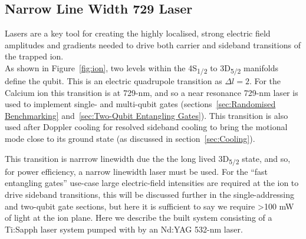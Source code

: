     
\subsection{Narrow Line Width 729 Laser}
\label{sec:Narrow Line Width 729 Laser} 

    Lasers are a key tool for creating the highly localised, strong electric
    field amplitudes and gradients needed to drive both carrier and sideband
    transitions of the trapped ion.\\ As shown in Figure~\ref{fig:ion}, 
    two levels within the 4S\textsubscript{1/2} to 3D\textsubscript{5/2}
    manifolds define the qubit. This is an electric quadrupole transition as
    $\Delta l = 2$.  For the Calcium ion this transition is at 729-nm, and so 
    a near resonance 729-nm laser is used to implement single- and multi-qubit gates
    (sections~\ref{sec:Randomised Benchmarking} and~\ref{sec:Two-Qubit
    Entangling Gates}). This transition is also used after Doppler cooling for
    resolved sideband cooling to bring the motional mode close to its ground
    state (as discussed in section~\ref{sec:Cooling}).

    This transition is narrrow linewidth due the the long lived
    3D\textsubscript{5/2} state, and so, for power efficiency, a
    narrow linewidth laser must be used. For the ``fast entangling gates'' use-case 
    large electric-field intensities are required at the ion to drive sideband
    transitions, this will be discussed further in the single-addressing and
    two-qubit gate sections, but here it is sufficient to say we require >100 mW
    of light at the ion plane.  Here we describe the built system 
    consisting of a Ti:Sapph laser system pumped with by an Nd:YAG 532-nm laser.\\

